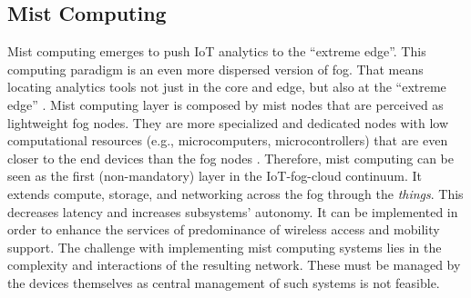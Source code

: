 \subsection{Mist Computing}
Mist computing emerges to push IoT analytics to the ``extreme edge''. This computing paradigm is an even more dispersed version of fog. That means locating analytics tools not just in the core and edge, but also at the ``extreme edge'' \cite{Ciscopus95:online}. Mist computing layer is composed by mist nodes that are perceived as lightweight fog nodes. They are more specialized and dedicated nodes with low computational resources (e.g., microcomputers, microcontrollers) that are even closer to the end devices than the fog nodes \cite{iorga2018fog}. Therefore, mist computing can be seen as the first (non-mandatory) layer in the IoT-fog-cloud continuum. It extends compute, storage, and networking across the fog through the \textit{things}. This decreases latency and increases subsystems' autonomy. It can be implemented in order to enhance the services of predominance of wireless access and mobility support. The challenge with implementing mist computing systems lies in the complexity and interactions of the resulting network. These must be managed by the devices themselves as central management of such systems is not feasible.

